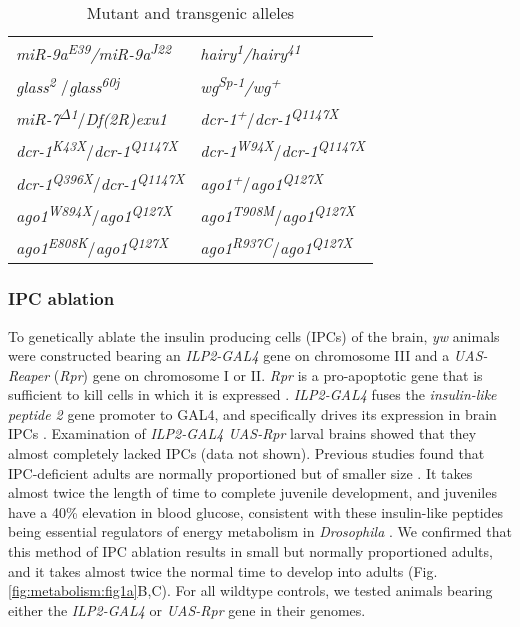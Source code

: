 \begin{table}[h!]
\centering
\caption{Mutant and transgenic alleles}
\label{appendix:supp:metabolism:exp:alleles_table}
\begin{tabular}{L{2in} L{2in}}
\toprule
\textit{miR-9a\textsuperscript{E39}/miR-9a\textsuperscript{J22}} & \textit{hairy\textsuperscript{1}/hairy\textsuperscript{41}} \\
\textit{glass\textsuperscript{2 }}/\textit{glass\textsuperscript{60j}} & \textit{wg\textsuperscript{Sp-1}/wg\textsuperscript{+}} \\
\textit{miR-7\textsuperscript{$\Delta$1}}/\textit{Df(2R)exu1} & \textit{dcr-1\textsuperscript{+}}/\textit{dcr-1\textsuperscript{Q1147X}} \\
\textit{dcr-1\textsuperscript{K43X}}/\textit{dcr-1\textsuperscript{Q1147X}} & \textit{dcr-1\textsuperscript{W94X}}/\textit{dcr-1\textsuperscript{Q1147X}} \\
\textit{dcr-1\textsuperscript{Q396X}}/\textit{dcr-1\textsuperscript{Q1147X}} & \textit{ago1\textsuperscript{+}}/\textit{ago1\textsuperscript{Q127X}} \\
\textit{ago1\textsuperscript{W894X}}/\textit{ago1\textsuperscript{Q127X}} & \textit{ago1\textsuperscript{T908M}}/\textit{ago1\textsuperscript{Q127X}} \\
\textit{ago1\textsuperscript{E808K}}/\textit{ago1\textsuperscript{Q127X}} & \textit{ago1\textsuperscript{R937C}}/\textit{ago1\textsuperscript{Q127X}} \\
\bottomrule
\end{tabular}
\end{table}

\subsubsection{IPC ablation}
\label{appendix:supp:metabolism:exp:ipc_ablation}

To genetically ablate the insulin producing cells (IPCs) of the brain, \textit{yw} animals were constructed bearing an \textit{ILP2-GAL4} gene on chromosome III and a \textit{UAS-Reaper} (\textit{Rpr}) gene on chromosome I or II. \textit{Rpr} is a pro-apoptotic gene that is sufficient to kill cells in which it is expressed \cite{Lohmann2002}. \textit{ILP2-GAL4} fuses the \textit{insulin-like peptide 2} gene promoter to GAL4, and specifically drives its expression in brain IPCs \cite{Rulifson2002}. Examination of \textit{ILP2-GAL4 UAS-Rpr} larval brains showed that they almost completely lacked IPCs (data not shown). Previous studies found that IPC-deficient adults are normally proportioned but of smaller size \cite{Rulifson2002}. It takes almost twice the length of time to complete juvenile development, and juveniles have a 40\% elevation in blood glucose, consistent with these insulin-like peptides being essential regulators of energy metabolism in \textit{Drosophila} \cite{Rulifson2002}. We confirmed that this method of IPC ablation results in small but normally proportioned adults, and it takes almost twice the normal time to develop into adults (Fig. \ref{fig:metabolism:fig1a}B,C). For all wildtype controls, we tested animals bearing either the \textit{ILP2-GAL4} or \textit{UAS-Rpr} gene in their genomes.

